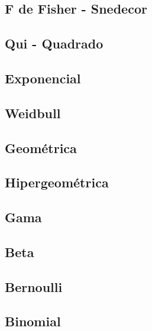 \documentclass[
]{book}
\begin{document}
\hypertarget{f-de-fisher---snedecor}{%
\subsection{F de Fisher - Snedecor}\label{f-de-fisher---snedecor}}

\hypertarget{qui---quadrado}{%
\subsection{Qui - Quadrado}\label{qui---quadrado}}

\hypertarget{exponencial}{%
\subsection{Exponencial}\label{exponencial}}

\hypertarget{weidbull}{%
\subsection{Weidbull}\label{weidbull}}

\hypertarget{geomuxe9trica}{%
\subsection{Geométrica}\label{geomuxe9trica}}

\hypertarget{hipergeomuxe9trica}{%
\subsection{Hipergeométrica}\label{hipergeomuxe9trica}}

\hypertarget{gama}{%
\subsection{Gama}\label{gama}}

\hypertarget{beta}{%
\subsection{Beta}\label{beta}}

\hypertarget{bernoulli}{%
\subsection{Bernoulli}\label{bernoulli}}

\hypertarget{binomial}{%
\subsection{Binomial}\label{binomial}}
\end{document}
